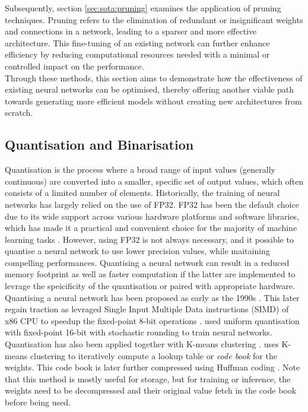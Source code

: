 Subsequently, section \cref{sec:sota:pruning} examines the application of
pruning techniques. Pruning refers to the elimination of redundant or
insignificant weights and connections in a network, leading to a sparser and
more effective architecture. This fine-tuning of an existing network can further
enhance efficiency by reducing computational resources needed with a minimal or
controlled impact on the performance.\\

Through these methods, this section aims to demonstrate how the effectiveness of
existing neural networks can be optimised, thereby offering another viable path
towards generating more efficient models without creating new architectures from
scratch.\\

\subsection{Quantisation and Binarisation}\label{sec:sota:quantisation}

Quantisation is the process where a broad range of input values (generally
continuous) are converted into a smaller, specific set of output values, which
often consists of a limited number of elements. Historically, the training of
neural networks has largely relied on the use of \ac{FP32}. FP32 has been the
default choice due to its wide support across various hardware platforms and
software libraries, which has made it a practical and convenient choice for the
majority of machine learning tasks \cite{sze2017efficient}. However, using
\acl{FP32} is not always necessary, and it possible to quantise a neural network
to use lower precision values, while maitaining compelling performances.
Quantising a neural network can result in a reduced memory footprint as well as
faster computation if the latter are implemented to levrage the speicificity of
the quantisation or paired with appropriate hardware.\\

Quantising a neural network has been proposed as early as the 1990s
\cite{balzer1991weight,fiesler1990weight}. This later regain traction as
\citeauthor{37631} levraged Single Input Multiple Data instructions (SIMD) of
x86 CPU to speedup the fixed-point 8-bit operations \cite{37631}.
\citeauthor{gupta2015deep} used uniform quantisation with fixed-point 16-bit
with stochastic rounding to train neural networks. Quantisation has also been
applied together with K-means clustering \cite{steinhaus1956division}.
\cite{DBLP:journals/corr/HanMD15} uses K-means clustering to iteratively compute
a lookup table or \emph{code book} for the weights. This code book is later
further compressed using Huffman coding \cite{huffman1952method}. Note that this
method is mostly useful for storage, but for training or inference, the weights
need to be decompressed and their original value fetch in the code book before
being used.\\

